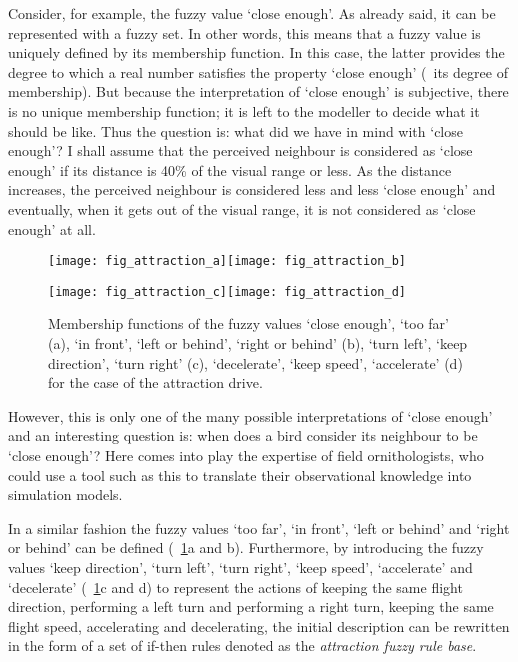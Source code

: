 Consider, for example, the fuzzy value `close enough'. As already said, it can be represented with a fuzzy set. In other words, this means that a fuzzy value is uniquely defined by its membership function. In this case, the latter provides the degree to which a real number satisfies the property `close enough' (\ie\ its degree of membership). But because the interpretation of `close enough' is subjective, there is no unique membership function; it is left to the modeller to decide what it should be like. Thus the question is: what did we have in mind with `close enough'? I shall assume that the perceived neighbour is considered as `close enough' if its distance is 40\% of the visual range or less. As the distance increases, the perceived neighbour is considered less and less `close enough' and eventually, when it gets out of the visual range, it is not considered as `close enough' at all. 
%
\begin{figure}
  \null\vspace*{2mm}\par
  \texttt{[image: fig\_attraction\_a]}\hspace*{2mm}\texttt{[image: fig\_attraction\_b]}
  \par\vspace*{2mm}
  \texttt{[image: fig\_attraction\_c]}\hspace*{2mm}\texttt{[image: fig\_attraction\_d]}
  \par\vspace*{2mm}
  \caption{Membership functions of the fuzzy values `close enough', `too far' (a), `in front', `left or behind', `right or behind' (b), `turn left', `keep direction', `turn right' (c), `decelerate', `keep speed', `accelerate' (d) for the case of the attraction drive.}
  \label{fig:fuzzyAnimat:Da:afd}
\end{figure}
%
However, this is only one of the many possible interpretations of `close enough' and an interesting question is: when does a bird consider its neighbour to be `close enough'? Here comes into play the expertise of field ornithologists, who could use a tool such as this to translate their observational knowledge into simulation models.

In a similar fashion the fuzzy values `too far', `in front', `left or behind' and `right or behind' can be defined (\figs~\ref{fig:fuzzyAnimat:Da:afd}a and b). Furthermore, by introducing the fuzzy values `keep direction', `turn left', `turn right', `keep speed', `accelerate' and `decelerate' (\figs~\ref{fig:fuzzyAnimat:Da:afd}c and d) to represent the actions of keeping the same flight direction, performing a left turn and performing a right turn, keeping the same flight speed, accelerating and decelerating, the initial description can be rewritten in the form of a set of if-then rules denoted as the \emph{attraction fuzzy rule base}.

